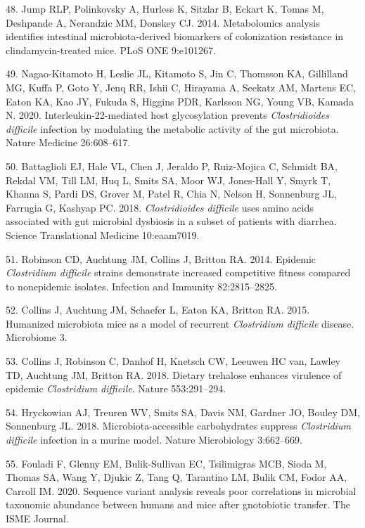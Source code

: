 \documentclass[11pt,]{article}
\begin{document}
\hypertarget{ref-Jump2014}{}
48. Jump RLP, Polinkovsky A, Hurless K, Sitzlar B, Eckart K, Tomas M,
Deshpande A, Nerandzic MM, Donskey CJ. 2014. Metabolomics analysis
identifies intestinal microbiota-derived biomarkers of colonization
resistance in clindamycin-treated mice. PLoS ONE 9:e101267.

\hypertarget{ref-NagaoKitamoto2020}{}
49. Nagao-Kitamoto H, Leslie JL, Kitamoto S, Jin C, Thomsson KA,
Gillilland MG, Kuffa P, Goto Y, Jenq RR, Ishii C, Hirayama A, Seekatz
AM, Martens EC, Eaton KA, Kao JY, Fukuda S, Higgins PDR, Karlsson NG,
Young VB, Kamada N. 2020. Interleukin-22-mediated host glycosylation
prevents \emph{Clostridioides difficile} infection by modulating the
metabolic activity of the gut microbiota. Nature Medicine 26:608--617.

\hypertarget{ref-Battaglioli2018}{}
50. Battaglioli EJ, Hale VL, Chen J, Jeraldo P, Ruiz-Mojica C, Schmidt
BA, Rekdal VM, Till LM, Huq L, Smits SA, Moor WJ, Jones-Hall Y, Smyrk T,
Khanna S, Pardi DS, Grover M, Patel R, Chia N, Nelson H, Sonnenburg JL,
Farrugia G, Kashyap PC. 2018. \emph{Clostridioides difficile} uses amino
acids associated with gut microbial dysbiosis in a subset of patients
with diarrhea. Science Translational Medicine 10:eaam7019.

\hypertarget{ref-Robinson2014}{}
51. Robinson CD, Auchtung JM, Collins J, Britton RA. 2014. Epidemic
\emph{Clostridium difficile} strains demonstrate increased competitive
fitness compared to nonepidemic isolates. Infection and Immunity
82:2815--2825.

\hypertarget{ref-Collins2015}{}
52. Collins J, Auchtung JM, Schaefer L, Eaton KA, Britton RA. 2015.
Humanized microbiota mice as a model of recurrent \emph{Clostridium
difficile} disease. Microbiome 3.

\hypertarget{ref-Collins2018}{}
53. Collins J, Robinson C, Danhof H, Knetsch CW, Leeuwen HC van, Lawley
TD, Auchtung JM, Britton RA. 2018. Dietary trehalose enhances virulence
of epidemic \emph{Clostridium difficile}. Nature 553:291--294.

\hypertarget{ref-Hryckowian2018}{}
54. Hryckowian AJ, Treuren WV, Smits SA, Davis NM, Gardner JO, Bouley
DM, Sonnenburg JL. 2018. Microbiota-accessible carbohydrates suppress
\emph{Clostridium difficile} infection in a murine model. Nature
Microbiology 3:662--669.

\hypertarget{ref-Fouladi2020}{}
55. Fouladi F, Glenny EM, Bulik-Sullivan EC, Tsilimigras MCB, Sioda M,
Thomas SA, Wang Y, Djukic Z, Tang Q, Tarantino LM, Bulik CM, Fodor AA,
Carroll IM. 2020. Sequence variant analysis reveals poor correlations in
microbial taxonomic abundance between humans and mice after gnotobiotic
transfer. The ISME Journal.
\end{document}
